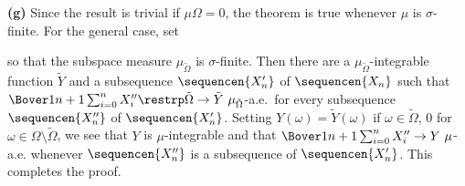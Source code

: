 {\medskip

{\bf (g)} Since the result is trivial if $\mu\Omega=0$, the theorem is
true whenever $\mu$ is $\sigma$-finite.   For the general case, set


\noindent so that the subspace measure $\mu_{\tilde\Omega}$ is
$\sigma$-finite.   Then there are a $\mu_{\tilde\Omega}$-integrable
function $\tilde Y$ and a subsequence $\sequencen{X'_n}$ of
$\sequencen{X_n}$ such that
$\Bover1{n+1}\sum_{i=0}^nX''_i\restrp\tilde\Omega\to\tilde Y\,\,
\mu_{\tilde\Omega}$-a.e.\ for every subsequence $\sequencen{X''_n}$ of
$\sequencen{X'_n}$.   Setting $Y(\omega)=\tilde Y(\omega)$ if
$\omega\in\tilde\Omega$, $0$ for $\omega\in\Omega\setminus\tilde\Omega$,
we see that $Y$ is $\mu$-integrable and that
$\Bover1{n+1}\sum_{i=0}^nX''_i\to Y\,\,\mu$-a.e. whenever
$\sequencen{X''_n}$ is a subsequence of $\sequencen{X'_n}$.   This
completes the proof.
}%

